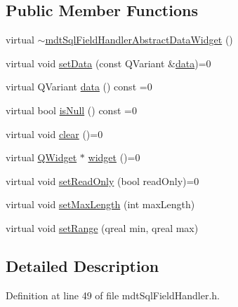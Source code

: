 \subsection*{Public Member Functions}
\begin{DoxyCompactItemize}
\item 
virtual \hyperlink{classmdt_sql_field_handler_abstract_data_widget_a063503e3a081f5ead335407b7da85bbf}{$\sim$mdt\-Sql\-Field\-Handler\-Abstract\-Data\-Widget} ()
\item 
virtual void \hyperlink{classmdt_sql_field_handler_abstract_data_widget_a5d9e6c6bfa923f07598179c71c88ba4b}{set\-Data} (const Q\-Variant \&\hyperlink{classmdt_sql_field_handler_abstract_data_widget_a90f1259501179fc28cd46bdf9c5f7d55}{data})=0
\item 
virtual Q\-Variant \hyperlink{classmdt_sql_field_handler_abstract_data_widget_a90f1259501179fc28cd46bdf9c5f7d55}{data} () const =0
\item 
virtual bool \hyperlink{classmdt_sql_field_handler_abstract_data_widget_a077d5b1b9a0cb592be9def99cdc6ad3a}{is\-Null} () const =0
\item 
virtual void \hyperlink{classmdt_sql_field_handler_abstract_data_widget_a54c1bc177f2a5f06d29ce24a801b6b3e}{clear} ()=0
\item 
virtual \hyperlink{class_q_widget}{Q\-Widget} $\ast$ \hyperlink{classmdt_sql_field_handler_abstract_data_widget_a460c76d650eba635ffb42951c7adbb50}{widget} ()=0
\item 
virtual void \hyperlink{classmdt_sql_field_handler_abstract_data_widget_a5d358ea305c375309c83be572dae2562}{set\-Read\-Only} (bool read\-Only)=0
\item 
virtual void \hyperlink{classmdt_sql_field_handler_abstract_data_widget_a7167463d910f13cff681668b4bc0e139}{set\-Max\-Length} (int max\-Length)
\item 
virtual void \hyperlink{classmdt_sql_field_handler_abstract_data_widget_a1c391f7af13f1a451354273352934801}{set\-Range} (qreal min, qreal max)
\end{DoxyCompactItemize}


\subsection{Detailed Description}


Definition at line 49 of file mdt\-Sql\-Field\-Handler.\-h.



